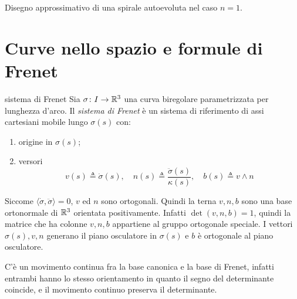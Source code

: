 \documentclass[a4paper]{article}
\begin{document}
\begin{center}
\end{center}

Disegno approssimativo di una spirale autoevoluta nel caso \(n=1\).

\pagebreak



\section{Curve nello spazio e formule di Frenet}

\begin{snippetdefinition}{sistema di Frenet}
    Sia \(\sigma \colon I \to \mathbb{R}^3\)
    una curva biregolare parametrizzata per lunghezza d'arco.
    Il \emph{sistema di Frenet} è un sistema di riferimento di assi cartesiani
    mobile lungo \(\sigma(s)\) con:
    \begin{enumerate}
        \item origine in \(\sigma(s)\);
        \item versori \[
            v(s) \triangleq \dot\sigma(s),
            \quad
            n(s) \triangleq  \frac{\ddot \sigma(s)}{\kappa(s)},
            \quad
            b(s) \triangleq v \wedge n
        \]
    \end{enumerate}
\end{snippetdefinition}

Siccome \(\langle \dot\sigma, \ddot\sigma \rangle = 0\),
\(v\) ed \(n\) sono ortogonali.
Quindi la terna \(v,n,b\) sono una base ortonormale di \(\mathbb{R}^3\)
orientata positivamente. Infatti \(\det(v,n,b) = 1\), quindi la matrice che ha colonne \(v,n,b\)
appartiene al gruppo ortogonale speciale.
I vettori \(\sigma(s), v, n\) generano il piano osculatore in \(\sigma(s)\)
e \(b\) è ortogonale al piano osculatore.

C'è un movimento continua fra la base canonica e la base di Frenet,
infatti entrambi hanno lo stesso orientamento in quanto il segno del determinante coincide,
e il movimento continuo preserva il determinante.
\end{document}
